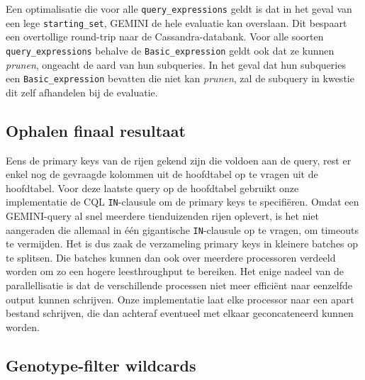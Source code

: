 \begin{itemize}


\end{itemize}

Een optimalisatie die voor alle \texttt{query\_expressions} geldt is dat in het geval van een lege \texttt{starting\_set}, GEMINI de hele evaluatie kan overslaan. Dit bespaart een overtollige round-trip naar de Cassandra-databank. Voor alle soorten \texttt{query\_expressions} behalve de \texttt{Basic\_expression} geldt ook dat ze kunnen \textit{prunen}, ongeacht de aard van hun subqueries. In het geval dat hun subqueries een \texttt{Basic\_expression} bevatten die niet kan \textit{prunen}, zal de subquery in kwestie dit zelf afhandelen bij de evaluatie.

\subsection{Ophalen finaal resultaat}

Eens de primary keys van de rijen gekend zijn die voldoen aan de query, rest er enkel nog de gevraagde kolommen uit de hoofdtabel op te vragen uit de hoofdtabel. Voor deze laatste query op de hoofdtabel gebruikt onze implementatie de CQL \texttt{IN}-clausule om de primary keys te  specifi\"eren. Omdat een GEMINI-query al snel meerdere tienduizenden rijen oplevert, is het niet aangeraden die allemaal in \'e\'en gigantische \texttt{IN}-clausule op te vragen, om timeouts te vermijden. Het is dus zaak de verzameling primary keys in kleinere batches op te splitsen. Die batches kunnen dan ook over meerdere processoren verdeeld worden om zo een hogere leesthroughput te bereiken. Het enige nadeel van de parallellisatie is dat de verschillende processen niet meer effici\"ent naar eenzelfde output kunnen schrijven. Onze implementatie laat elke processor naar een apart bestand schrijven, die dan achteraf eventueel met elkaar geconcateneerd kunnen worden.

\subsection{Genotype-filter wildcards}
\label{gt_wildcards}

